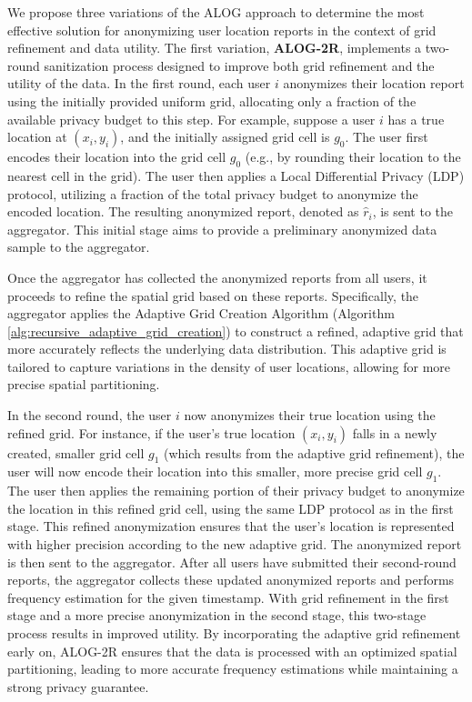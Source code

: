 We propose three variations of the ALOG approach to determine the most effective solution for anonymizing user location reports in the context of grid refinement and data utility. The first variation, \textbf{ALOG-2R}, implements a two-round sanitization process designed to improve both grid refinement and the utility of the data. In the first round, each user $i$ anonymizes their location report using the initially provided uniform grid, allocating only a fraction of the available privacy budget to this step. For example, suppose a user $i$ has a true location at $(x_i, y_i)$, and the initially assigned grid cell is $g_0$. The user first encodes their location into the grid cell $g_0$ (e.g., by rounding their location to the nearest cell in the grid). The user then applies a Local Differential Privacy (LDP) protocol, utilizing a fraction of the total privacy budget to anonymize the encoded location. The resulting anonymized report, denoted as $\hat{r}_i$, is sent to the aggregator. This initial stage aims to provide a preliminary anonymized data sample to the aggregator.

Once the aggregator has collected the anonymized reports from all users, it proceeds to refine the spatial grid based on these reports. Specifically, the aggregator applies the Adaptive Grid Creation Algorithm (Algorithm \ref{alg:recursive_adaptive_grid_creation}) to construct a refined, adaptive grid that more accurately reflects the underlying data distribution. This adaptive grid is tailored to capture variations in the density of user locations, allowing for more precise spatial partitioning.

In the second round, the user $i$ now anonymizes their true location using the refined grid. For instance, if the user's true location $(x_i, y_i)$ falls in a newly created, smaller grid cell $g_1$ (which results from the adaptive grid refinement), the user will now encode their location into this smaller, more precise grid cell $g_1$. The user then applies the remaining portion of their privacy budget to anonymize the location in this refined grid cell, using the same LDP protocol as in the first stage. This refined anonymization ensures that the user's location is represented with higher precision according to the new adaptive grid. The anonymized report is then sent to the aggregator. After all users have submitted their second-round reports, the aggregator collects these updated anonymized reports and performs frequency estimation for the given timestamp. With grid refinement in the first stage and a more precise anonymization in the second stage, this two-stage process results in improved utility. By incorporating the adaptive grid refinement early on, ALOG-2R ensures that the data is processed with an optimized spatial partitioning, leading to more accurate frequency estimations while maintaining a strong privacy guarantee.


